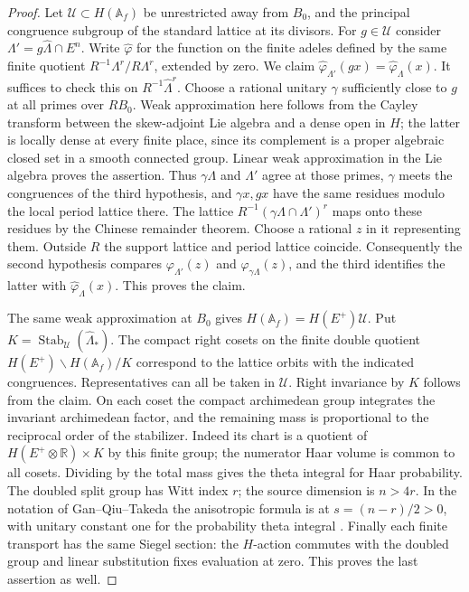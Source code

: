 \begin{proof}
Let \(\mathcal U\subset H(\mathbb A_f)\) be unrestricted away
from \(B_0\), and the principal congruence subgroup of the
standard lattice at its divisors. For \(g\in\mathcal U\)
consider \(\Lambda'=g\widehat\Lambda\cap E^n\). Write
\(\widehat\varphi\) for the function on the finite adeles
defined by the same finite quotient
\(R^{-1}\Lambda^r/R\Lambda^r\), extended by zero.
We claim
\(\widehat\varphi_{\Lambda'}(g x)=\widehat\varphi_\Lambda(x)\).
It suffices to check this on \(R^{-1}\widehat\Lambda^r\).
Choose a rational unitary \(\gamma\) sufficiently close to \(g\)
at all primes over \(RB_0\). Weak approximation here follows
from the Cayley transform between the skew-adjoint Lie algebra
and a dense open in \(H\); the latter is locally dense at every
finite place, since its complement is a proper algebraic closed
set in a smooth connected group. Linear weak approximation in
the Lie algebra proves the assertion. Thus \(\gamma\Lambda\)
and \(\Lambda'\) agree at those primes, \(\gamma\) meets the
congruences of the third hypothesis, and \(\gamma x,g x\)
have the same residues modulo the local period lattice there.
The lattice \(R^{-1}(\gamma\Lambda\cap\Lambda')^r\) maps onto
these residues by the Chinese remainder theorem. Choose a
rational \(z\) in it representing them. Outside \(R\) the
support lattice and period lattice coincide. Consequently the
second hypothesis compares \(\varphi_{\Lambda'}(z)\) and
\(\varphi_{\gamma\Lambda}(z)\), and the third identifies the latter
with \(\widehat\varphi_\Lambda(x)\). This proves the claim.

The same weak approximation at \(B_0\) gives
\(H(\mathbb A_f)=H(E^+)\mathcal U\).
Put \(K=\operatorname{Stab}_{\mathcal U}(\widehat\Lambda_*)\).
The compact right cosets on the finite double quotient
\(H(E^+)\backslash H(\mathbb A_f)/K\) correspond to the
lattice orbits with the indicated congruences. Representatives
can all be taken in \(\mathcal U\). Right invariance by \(K\)
follows from the claim. On each coset the compact archimedean
group integrates the invariant archimedean factor, and the
remaining mass is proportional to the reciprocal order of
the stabilizer. Indeed its chart is a quotient of
\(H(E^+\otimes\mathbb R)\times K\) by this finite group;
the numerator Haar volume is common to all cosets. Dividing by
the total mass gives the theta integral for Haar probability.
The doubled split group has Witt index \(r\); the source
dimension is \(n>4r\). In the notation of Gan--Qiu--Takeda the
anisotropic formula is at \(s=(n-r)/2>0\), with unitary
constant one for the probability theta integral
\cite[\S3.1 and Theorem~7.1]{ganQiuTakeda}. Finally each
finite transport has the same Siegel section: the \(H\)-action
commutes with the doubled group and linear substitution fixes
evaluation at zero. This proves the last assertion as well.
\end{proof}
